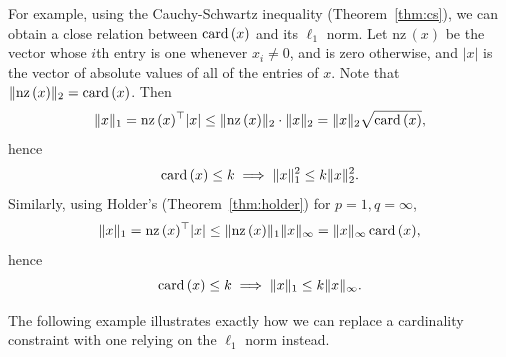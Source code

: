 \documentclass[11 pt]{scrartcl}
\newcommand{\nz}{\text{nz}\,}
\begin{document}
For example, using the Cauchy-Schwartz inequality (Theorem~\ref{thm:cs}), we can obtain a close relation between $\text{card}\,(x)$ and its $\ell_1$ norm. 
Let $\nz(x)$ be the vector whose $i$th entry is one whenever $x_i\not= 0$, and is zero otherwise, and $|x|$ is the vector of absolute values of all of the entries of $x$.
Note that $\|\nz(x)\|_2 = \card(x)$.
Then 
\[ \|x\|_1 = \nz(x)^\T |x| \leq \|\nz(x)\|_2 \cdot \|x\|_2 = \|x\|_2 \sqrt{\card(x)},\]
hence 
\[ \text{card}\,(x) \leq k \implies \|x\|_1^2 \leq k \|x\|_2^2.\] 
Similarly, using Holder's (Theorem~\ref{thm:holder}) for $p = 1, q=\infty$, 
\[ \|x\|_1 = \nz(x)^\T |x| \leq \|\nz(x)\|_1 \|x\|_\infty = \|x\|_\infty\, \card(x),\] 
hence 
\[ \text{card}\,(x) \leq k \implies \|x\|_1 \leq k\|x\|_\infty.\] 

The following example illustrates exactly how we can replace a cardinality constraint with one relying on the $\ell_1$ norm instead. 
\end{document}
